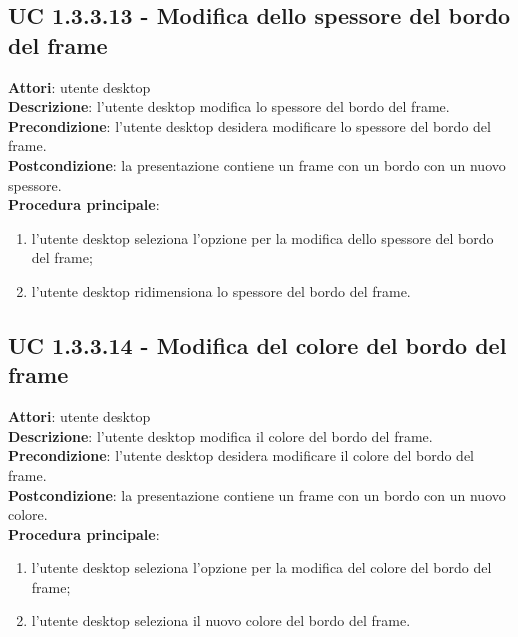 \subsection{UC 1.3.3.13 - Modifica dello spessore del bordo del frame}{
	\label{uc1.3.3.13}
	\textbf{Attori}: utente desktop \\
	\textbf{Descrizione}: l'utente desktop modifica lo spessore del bordo del frame. \\
	\textbf{Precondizione}: l'utente desktop desidera modificare lo spessore del bordo del frame.	\\
	\textbf{Postcondizione}: la presentazione contiene un frame con un bordo con un nuovo spessore.	\\
	\textbf{Procedura principale}:
	\begin{enumerate}
		\item l'utente desktop seleziona l'opzione per la modifica dello spessore del bordo del frame;
		\item l'utente desktop ridimensiona lo spessore del bordo del frame.
	\end{enumerate}
	}
\subsection{UC 1.3.3.14 - Modifica del colore del bordo del frame}{
	\label{uc1.3.3.14}
	\textbf{Attori}: utente desktop \\
	\textbf{Descrizione}: l'utente desktop modifica il colore del bordo del frame. \\
	\textbf{Precondizione}: l'utente desktop desidera modificare il colore del bordo del frame.	\\
	\textbf{Postcondizione}: la presentazione contiene un frame con un bordo con un nuovo colore.	\\
	\textbf{Procedura principale}:
	\begin{enumerate}
		\item l'utente desktop seleziona l'opzione per la modifica del colore del bordo del frame;
		\item l'utente desktop seleziona il nuovo colore del bordo del frame.
	\end{enumerate}
	}

